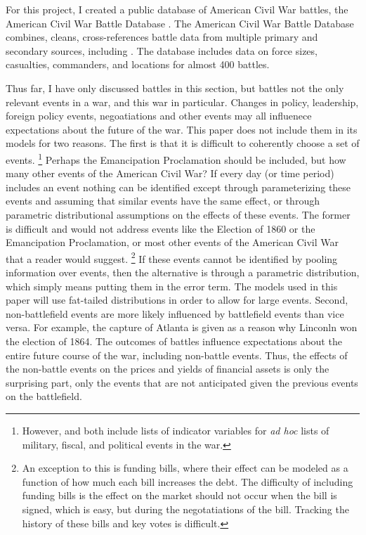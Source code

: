 For this project, I created a public database of American Civil War battles, the American Civil War Battle Database \parencite{Arnold2015b}.
The American Civil War Battle Database combines, cleans, cross-references battle data from multiple primary and secondary sources, including \textcites{Phisterer1883}{Livermore1900}{Bodart1908}{dyer1908_war_rebel}{KennedyConservation1998}{CWSAC1993}{cwsac2012}.
The database includes data on force sizes, casualties, commanders, and locations for almost 400 battles.

Thus far, I have only discussed battles in this section, but battles not the only relevant events in a war, and this war in particular.
Changes in policy, leadership, foreign policy events, negoatiations and other events may all influenece expectations about the future of the war.
This paper does not include them in its models for two reasons. 
The first is that it is difficult to coherently choose a set of events. 
\footnote{
  However, \textcite{McCandless1996} and \textcite{SmithSmith1997} both include lists of indicator variables for \textit{ad hoc} lists of military, fiscal, and political events in the war.
}
Perhaps the Emancipation Proclamation should be included, but how many other events of the American Civil War? 
If every day (or time period) includes an event nothing can be identified except through parameterizing these events and assuming that similar events have the same effect, or through parametric distributional assumptions on the effects of these events.%
The former is difficult and would not address events like the Election of 1860 or the Emancipation Proclamation, or most other events of the American Civil War that a reader would suggest.%
\footnote{
  An exception to this is funding bills, where their effect can be modeled as a function of how much each bill increases the debt.
  The difficulty of including funding bills is the effect on the market should not occur when the bill is signed, which is easy, but during the negotatiations of the bill.
  Tracking the history of these bills and key votes is difficult.
}
If these events cannot be identified by pooling information over events, then the alternative is through a parametric distribution, which simply means putting them in the error term. 
The models used in this paper will use fat-tailed distributions in order to allow for large events.
Second, non-battlefield events are more likely influenced by battlefield events than vice versa. 
For example, the capture of Atlanta is given as a reason why Linconln won the election of 1864.
The outcomes of battles influence expectations about the entire future course of the war, including non-battle events. 
Thus, the effects of the non-battle events on the prices and yields of financial assets is only the surprising part, only the events that are not anticipated given the previous events on the battlefield.


